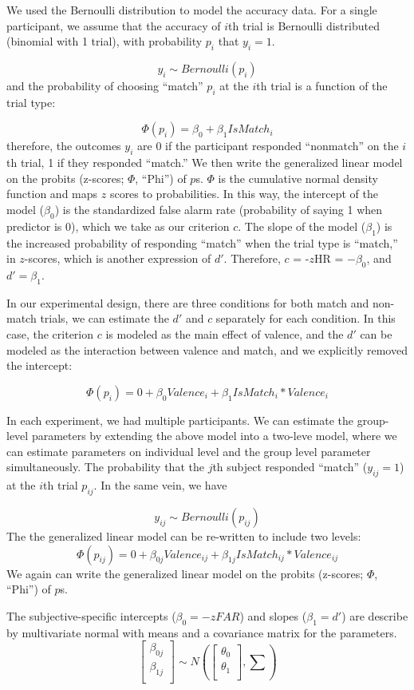 \documentclass[
  english,
  man]{apa6}
\begin{document}
We used the Bernoulli distribution to model the accuracy data. For a single participant, we assume that the accuracy of \(i\)th trial is Bernoulli distributed (binomial with 1 trial), with probability \(p_{i}\) that \(y_{i} = 1\).

\[ y_{i} \sim Bernoulli(p_{i})\]
and the probability of choosing ``match'' \(p_{i}\) at the \(i\)th trial is a function of the trial type:

\[ \Phi(p_{i}) =  \beta_{0} + \beta_{1}IsMatch_{i}\]
therefore, the outcomes \(y_{i}\) are 0 if the participant responded ``nonmatch'' on the \(i\)th trial, 1 if they responded ``match.'' We then write the generalized linear model on the probits (z-scores; \(\Phi\), ``Phi'') of \(p\)s. \(\Phi\) is the cumulative normal density function and maps \(z\) scores to probabilities. In this way, the intercept of the model (\(\beta_0\)) is the standardized false alarm rate (probability of saying 1 when predictor is 0), which we take as our criterion \(c\). The slope of the model (\(\beta_1\)) is the increased probability of responding ``match'' when the trial type is ``match,'' in \(z\)-scores, which is another expression of \(d'\). Therefore, \(c\) = -\(z\)HR = \(-\beta_0\), and \(d' = \beta_1\).

In our experimental design, there are three conditions for both match and non-match trials, we can estimate the \(d'\) and \(c\) separately for each condition. In this case, the criterion \(c\) is modeled as the main effect of valence, and the \(d'\) can be modeled as the interaction between valence and match, and we explicitly removed the intercept:

\[ \Phi(p_{i}) = 0 + \beta_{0}Valence_{i} + \beta_{1}IsMatch_{i}  * Valence_{i} \]

In each experiment, we had multiple participants. We can estimate the group-level parameters by extending the above model into a two-leve model, where we can estimate parameters on individual level and the group level parameter simultaneously. The probability that the \(j\)th subject responded ``match'' (\(y_{ij} = 1\)) at the \(i\)th trial \(p_{ij}\). In the same vein, we have

\[ y_{ij} \sim Bernoulli(p_{ij})\]
The the generalized linear model can be re-written to include two levels:
\[ \Phi(p_{ij}) = 0 + \beta_{0j}Valence_{ij} + \beta_{1j}IsMatch_{ij} * Valence_{ij}\]
We again can write the generalized linear model on the probits (z-scores; \(\Phi\), ``Phi'') of \(p\)s.

The subjective-specific intercepts (\(\beta_{0} = -zFAR\)) and slopes (\(\beta_{1} = d'\)) are describe by multivariate normal with means and a covariance matrix for the parameters.
\[ \begin{bmatrix}\beta_{0j}\\
\beta_{1j}\\
\end{bmatrix} \sim N(\begin{bmatrix}\theta_{0}\\
\theta_{1}\\
\end{bmatrix}, \sum) \]
\end{document}
